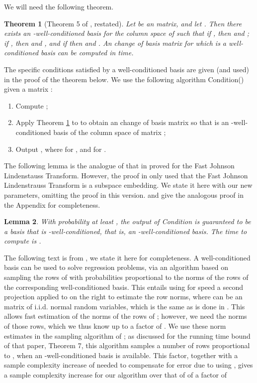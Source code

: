 \documentclass{sig-alternate}
\newtheorem{theorem}{Theorem}
\newtheorem{lemma}[theorem]{Lemma}
\begin{document}
We will need the following theorem.
\begin{theorem}[Theorem 5 of \cite{ddhkm09}, restated]
\label{thm:basisOld}
Let  be an  matrix, and let .
Then there exists an -well-conditioned basis for
the column space of  such that if , then  and ; 
if , then  and , and if  then 
 and . An  change of basis matrix
 for which  is a well-conditioned basis can be
computed in  time. 
\end{theorem}
\noindent
The specific conditions satisfied by a well-conditioned basis are given (and used)
in the proof of the theorem below. We use the following algorithm {\sf Condition}() 
given a matrix :
\begin{enumerate}
\item Compute ;
\item Apply Theorem \ref{thm:basisOld} to  to obtain an  change of basis
matrix  so that  is an -well-conditioned basis of the
column space of matrix ;
\item Output ,
where  for ,
and  for .
\end{enumerate}
The following lemma is the analogue of that in \cite{CDMMMW} proved for the Fast Johnson Lindenstauss
Transform. However, the proof in \cite{CDMMMW} only used that the Fast Johnson Lindenstrauss Transform is a subspace
embedding. We state it here with our new parameters,
\ifSTOC
omitting the proof in this version.
\else and give the analogous proof in the Appendix for completeness.
\fi \begin{lemma}\label{lem:lpl2}
With probability at least , the output  of {\sf Condition}
is guaranteed to be a basis that is -well-conditioned,
that is, an -well-conditioned basis.
The time to compute  is . 
\end{lemma}
The following text is from \cite{CDMMMW}, we state it here for completeness. 
A well-conditioned basis can be used 
to solve  regression problems, via an algorithm based on sampling the rows
of  with probabilities proportional to the norms of the rows of the corresponding
well-conditioned basis. This entails
using for speed a second projection  applied to  on the right
to estimate the row norms, where  can be an  matrix of 
i.i.d. normal random variables, which is the same as is done in \cite{dmmw11}. 
This allows fast estimation of the  norms of the rows of ;
however, we need the  norms of those rows, which we thus know up
to a factor of .
We use these norm estimates
in the sampling algorithm of \cite{ddhkm09}; as discussed for
the running time bound of that paper, Theorem 7, this algorithm samples
a number of rows proportional to ,
when an -well-conditioned
basis is available. This factor, together with
a sample complexity increase of  needed to compensate
for error due to using , gives a sample complexity increase for our algorithm
over that of \cite{ddhkm09} of a factor
of
\end{document}
